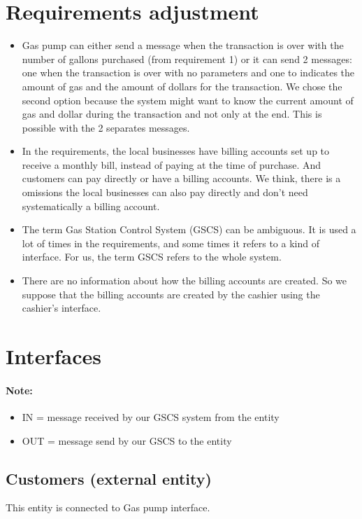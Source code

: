 \documentclass[11pt,a4paper]{article}
\begin{document}
\section{Requirements adjustment}
\begin{itemize}
	\item Gas pump can either send a message when the transaction is over with the number of gallons purchased (from requirement 1) or it can send 2 messages: one when the transaction is over with no parameters and one to indicates the amount of gas and the amount of dollars for the transaction.
We chose the second option because the system might want to know the current amount of gas and dollar during the transaction and not only at the end. This is possible with the 2 separates messages.
	\item In the requirements, the local businesses have billing accounts set up to receive a monthly bill, instead of paying at the time of purchase. And customers can pay directly or have a billing accounts. 
We think, there is a omissions the local businesses can also pay directly and don't need systematically a billing account.
	\item The term Gas Station Control System (GSCS) can be ambiguous. It is used a lot of times in the requirements, and some times it refers to a kind of interface. For us, the term GSCS refers to the whole system.
	\item There are no information about how the billing accounts are created. So we suppose that the billing accounts are created by the cashier using the cashier's interface.
\end{itemize}


\section{Interfaces}

\paragraph{Note:}  
\begin{itemize}
\item IN = message received by our GSCS system from the entity
\item OUT = message send by our GSCS to the entity
\end{itemize}


\subsection{Customers (external entity)}
This entity is connected to Gas pump interface.
\end{document}
